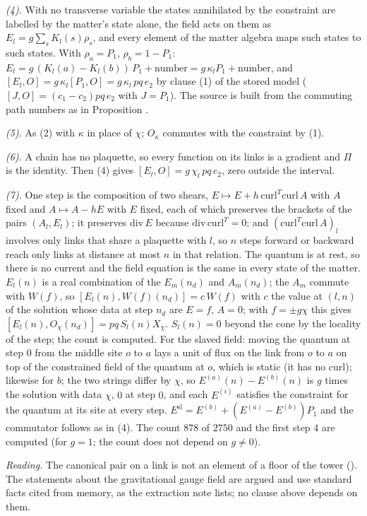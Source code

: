 \emph{(4).} With no transverse variable the states annihilated by the constraint are labelled by the matter's state alone, the field acts on them as $E_{l} = g\sum_{s}K_{l}(s)\rho_{s}$, and every element of the matter algebra maps such states to such states. With $\rho_{a} = P_{1}$, $\rho_{b} = 1 - P_{1}$: $E_{l} = g\,(K_{l}(a) - K_{l}(b))\,P_{1} + \text{number} = g\,\kappa_{l}P_{1} + \text{number}$, and $[E_{l}, O] = g\,\kappa_{l}[P_{1}, O] = g\,\kappa_{l}\,pq\,e_{2}$ by clause (1) of the stored model ($[J, O] = (c_{1} - c_{2})pq\,e_{2}$ with $J = P_{1}$). The source is built from the commuting path numbers as in Proposition .

\emph{(5).} As (2) with $\kappa$ in place of $\chi$; $O_{\kappa}$ commutes with the constraint by (1).

\emph{(6).} A chain has no plaquette, so every function on its links is a gradient and $\Pi$ is the identity. Then (4) gives $[E_{l}, O] = g\,\chi_{l}\,pq\,e_{2}$, zero outside the interval.

\emph{(7).} One step is the composition of two shears, $E \mapsto E + h\,\mathrm{curl}^{T}\mathrm{curl}\,A$ with $A$ fixed and $A \mapsto A - hE$ with $E$ fixed, each of which preserves the brackets of the pairs $(A_{l}, E_{l})$; it preserves $\mathrm{div}\,E$ because $\mathrm{div}\,\mathrm{curl}^{T} = 0$; and $(\mathrm{curl}^{T}\mathrm{curl}\,A)_{l}$ involves only links that share a plaquette with $l$, so $n$ steps forward or backward reach only links at distance at most $n$ in that relation. The quantum is at rest, so there is no current and the field equation is the same in every state of the matter. $E_{l}(n)$ is a real combination of the $E_{m}(n_{d})$ and $A_{m}(n_{d})$; the $A_{m}$ commute with $W(f)$, so $[E_{l}(n), W(f)(n_{d})] = c\,W(f)$ with $c$ the value at $(l, n)$ of the solution whose data at step $n_{d}$ are $E = f$, $A = 0$; with $f = \pm g\chi$ this gives $[E_{l}(n), O_{\chi}(n_{d})] = pq\,S_{l}(n)X_{\chi}$. $S_{l}(n) = 0$ beyond the cone by the locality of the step; the count is computed. For the slaved field: moving the quantum at step $0$ from the middle site $o$ to $a$ lays a unit of flux on the link from $o$ to $a$ on top of the constrained field of the quantum at $o$, which is static (it has no curl); likewise for $b$; the two strings differ by $\chi$, so $E^{(a)}(n) - E^{(b)}(n)$ is $g$ times the solution with data $\chi$, $0$ at step $0$, and each $E^{(i)}$ satisfies the constraint for the quantum at its site at every step. $E^{\mathrm{sl}} = E^{(b)} + (E^{(a)} - E^{(b)})P_{1}$ and the commutator follows as in (4). The count $878$ of $2750$ and the first step $4$ are computed (for $g = 1$; the count does not depend on $g \neq 0$).

\emph{Reading.} The canonical pair on a link is not an element of a floor of the tower (). The statements about the gravitational gauge field are argued and use standard facts cited from memory, as the extraction note lists; no clause above depends on them.
